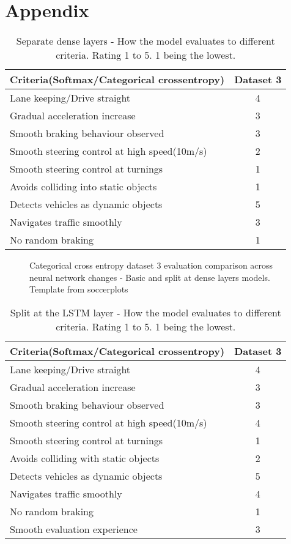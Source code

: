\chapter{Appendix}
\begin{table}[!ht]
    \centering
\begin{tabular}{lc}
    \toprule
    Criteria(Softmax/Categorical crossentropy) & Dataset 3 \\\midrule
    Lane keeping/Drive straight  & 4  \\
    Gradual acceleration increase  & 3 \\
    Smooth braking behaviour observed & 3 \\
    Smooth steering control at high speed(10m/s) & 2 \\
    Smooth steering control at turnings & 1\\
    Avoids colliding into static objects & 1 \\
    Detects vehicles as dynamic objects & 5 \\
    Navigates traffic smoothly & 3\\
    No random braking & 1 \\\bottomrule
\end{tabular}
\caption{Separate dense layers - How the model evaluates to different criteria. Rating 1
to 5. 1 being the lowest.}
\label{table:ccedense}
\end{table}
\begin{figure}[!ht]
    \centering
    \def\svgwidth{0.8\textwidth}
    
    \caption{Categorical cross entropy dataset 3 evaluation comparison across neural
    network changes - Basic and split at dense layers models. Template from soccerplots\cite{soccerplots}}
    \label{fig:radarccecompare1}
\end{figure}
\begin{table}[!ht]
    \centering
\begin{tabular}{lc}
    \toprule
    Criteria(Softmax/Categorical crossentropy) & Dataset 3 \\\midrule
    Lane keeping/Drive straight  & 4  \\
    Gradual acceleration increase  & 3\\
    Smooth braking behaviour observed & 3 \\
    Smooth steering control at high speed(10m/s) & 4 \\
    Smooth steering control at turnings & 1\\
    Avoids colliding with static objects & 2 \\
    Detects vehicles as dynamic objects & 5 \\
    Navigates traffic smoothly & 4\\
    No random braking & 1 \\
    Smooth evaluation experience & 3 \\\bottomrule

\end{tabular}
\caption{Split at the LSTM layer - How the model evaluates to different criteria. Rating 1
to 5. 1 being the lowest.}
\label{table:cceLSTM}
\end{table}
